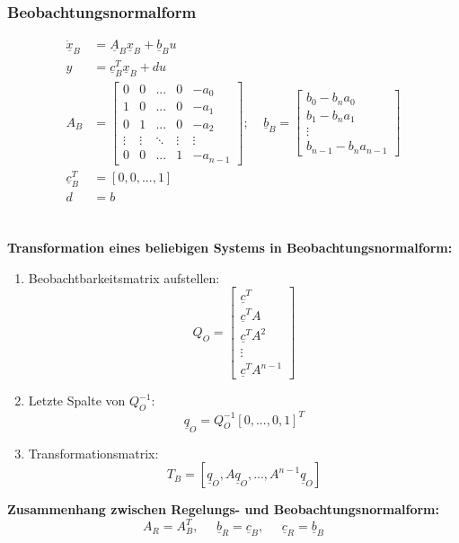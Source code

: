 \documentclass[a4paper,twocolumn,10pt]{article}
\begin{document}
\subsubsection{Beobachtungsnormalform}
\begin{equation*}
\begin{split}
\underline{\dot{x}}_B&=\underline{A}_B\underline{x}_B+\underline{b}_Bu\\
y&=\underline{c}_B^T\underline{x}_B+du\\
A_B&=\begin{bmatrix}0 & 0 & ... & 0 & -a_0 \\ 1 & 0 & ... & 0 & -a_1 \\ 0 & 1 & ... & 0 & -a_2 \\ \vdots & \vdots & \ddots & \vdots & \vdots \\ 0 & 0 & ... & 1 & -a_{n-1}\end{bmatrix};\;\;\;\;\underline{b}_B=\begin{bmatrix}b_0-b_na_0 \\ b_1-b_na_1 \\ \vdots \\ b_{n-1}-b_na_{n-1}\end{bmatrix}\\
\underline{c}_B^T&=[0,0,...,1]\\
d&=b
\end{split}
\end{equation*}\\\\
\textbf{Transformation eines beliebigen Systems in Beobachtungsnormalform:}\\
\begin{enumerate}
\item Beobachtbarkeitsmatrix aufstellen:
\begin{equation*}
Q_O=\begin{bmatrix}\underline{c}^T \\ \underline{c}^TA \\ \underline{c}^TA^2 \\ \vdots \\ \underline{c}^TA^{n-1}\end{bmatrix}
\end{equation*}
\item Letzte Spalte von $Q_O^{-1}$:
\begin{equation*}
\underline{q}_O=Q_O^{-1}[0,...,0,1]^T
\end{equation*}
\item Transformationsmatrix:
\begin{equation*}
T_B=[\underline{q}_O,A\underline{q}_O,...,A^{n-1}\underline{q}_O]
\end{equation*}
\end{enumerate}
\textbf{Zusammenhang zwischen Regelungs- und Beobachtungsnormalform:}
\begin{equation*}
A_R=A_B^T,\;\;\;\;\;\underline{b}_R=\underline{c}_B,\;\;\;\;\;\underline{c}_R=\underline{b}_B
\end{equation*}
\end{document}

